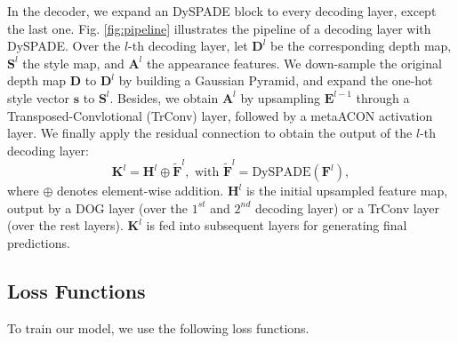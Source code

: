 \documentclass[10pt,twocolumn,letterpaper]{article}
\begin{document}



In the decoder, we expand an DySPADE block to every decoding layer, except the last one. 
Fig. \ref{fig:pipeline} illustrates the pipeline of a decoding layer with DySPADE. 
Over the $l$-th decoding layer, let $\mathbf{D}^{l}$ be the corresponding depth map, $\mathbf{S}^{l}$ the style map, and $\mathbf{A}^{l}$ the appearance features.
We down-sample the original depth map $\mathbf{D}$ to $\mathbf{D}^{l}$ by building a Gaussian Pyramid, and expand the one-hot style vector $\mathbf{s}$ to $\mathbf{S}^{l}$. 
Besides, we obtain $\mathbf{A}^l$ by upsampling $\mathbf{E}^{l-1}$ through a Transposed-Convlotional (TrConv) layer, followed by a metaACON activation layer.
We finally apply the residual connection to obtain the output of the $l$-th decoding layer: 
\begin{equation}
	\mathbf{K}^{l} = \mathbf{H}^l \oplus \tilde{\mathbf{F}}^l, \text{~with~} \tilde{\mathbf{F}}^l = \mathrm{DySPADE}(\mathbf{F}^l), 
\end{equation}
where $\oplus$ denotes element-wise addition. 
$\mathbf{H}^l$ is the initial upsampled feature map, output by a DOG layer (over the $1^{st}$ and $2^{nd}$ decoding layer) or a TrConv layer (over the rest layers).
$\mathbf{K}^{l}$ is fed into subsequent layers for generating final predictions.

\subsection{Loss Functions}
\label{ssec:loss}
To train our model, we use the following loss functions. 
\end{document}
